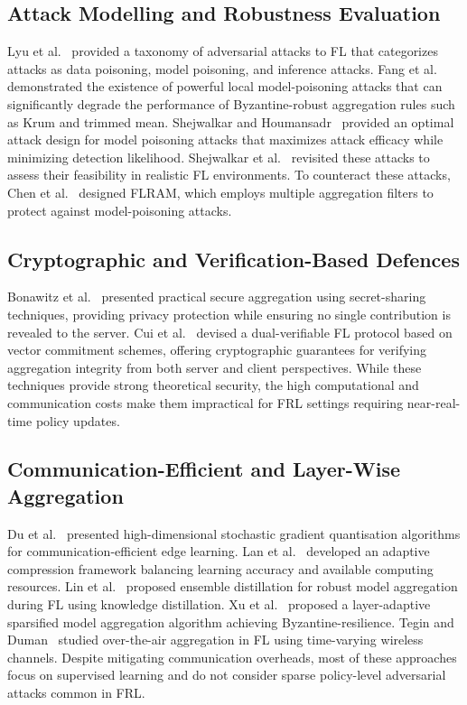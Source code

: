 \documentclass[12pt,a4paper]{article}
\begin{document}
\subsection{Attack Modelling and Robustness Evaluation}

Lyu et al.~\cite{ref23} provided a taxonomy of adversarial attacks to FL that
categorizes attacks as data poisoning, model poisoning, and inference attacks. Fang
et al.~\cite{ref16} demonstrated the existence of powerful local model-poisoning
attacks that can significantly degrade the performance of Byzantine-robust aggregation
rules such as Krum and trimmed mean. Shejwalkar and Houmansadr~\cite{ref8} provided an
optimal attack design for model poisoning attacks that maximizes attack efficacy while
minimizing detection likelihood. Shejwalkar et al.~\cite{ref5} revisited these attacks
to assess their feasibility in realistic FL environments. To counteract these attacks,
Chen et al.~\cite{ref27} designed FLRAM, which employs multiple aggregation filters to
protect against model-poisoning attacks.

\subsection{Cryptographic and Verification-Based Defences}

Bonawitz et al.~\cite{ref4} presented practical secure aggregation using
secret-sharing techniques, providing privacy protection while ensuring no single
contribution is revealed to the server. Cui et al.~\cite{ref26} devised a
dual-verifiable FL protocol based on vector commitment schemes, offering cryptographic
guarantees for verifying aggregation integrity from both server and client perspectives.
While these techniques provide strong theoretical security, the high computational and
communication costs make them impractical for FRL settings requiring near-real-time
policy updates.

\subsection{Communication-Efficient and Layer-Wise Aggregation}

Du et al.~\cite{ref12} presented high-dimensional stochastic gradient quantisation
algorithms for communication-efficient edge learning. Lan et al.~\cite{ref9} developed
an adaptive compression framework balancing learning accuracy and available computing
resources. Lin et al.~\cite{ref11} proposed ensemble distillation for robust model
aggregation during FL using knowledge distillation. Xu et al.~\cite{ref10} proposed a
layer-adaptive sparsified model aggregation algorithm achieving Byzantine-resilience.
Tegin and Duman~\cite{ref13} studied over-the-air aggregation in FL using
time-varying wireless channels. Despite mitigating communication overheads, most of
these approaches focus on supervised learning and do not consider sparse policy-level
adversarial attacks common in FRL.
\end{document}

